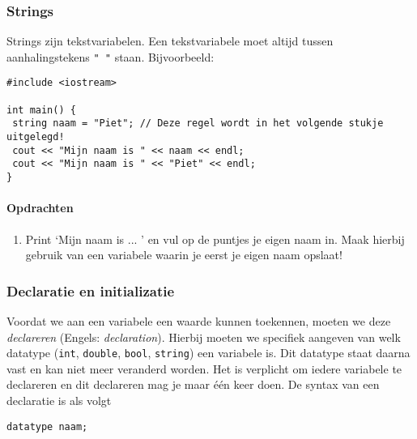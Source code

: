 \documentclass[12pt,a4paper]{article}
\newcommand{\icode}{\lstinline}
\begin{document}
\subsubsection{Strings}

Strings zijn tekstvariabelen. Een tekstvariabele moet altijd tussen aanhalingstekens \icode{" "} staan. 
Bijvoorbeeld: 

\begin{lstlisting}
#include <iostream> 

int main() {
 string naam = "Piet"; // Deze regel wordt in het volgende stukje uitgelegd! 
 cout << "Mijn naam is " << naam << endl;
 cout << "Mijn naam is " << "Piet" << endl; 
}
\end{lstlisting}

\paragraph{Opdrachten}
\begin{enumerate} 
\item 
Print `Mijn naam is ... ' en vul op de puntjes je eigen naam in. Maak hierbij gebruik van een variabele waarin je eerst je eigen naam opslaat! 
\end{enumerate} 

\subsubsection{Declaratie en initializatie}
Voordat we aan een variabele een waarde kunnen toekennen, moeten we deze \emph{declareren} (Engels: \emph{declaration}). 
Hierbij moeten we specifiek aangeven van welk datatype (\icode{int}, \icode{double}, \icode{bool}, 
\icode{string}) een variabele is. Dit datatype staat daarna vast en kan niet meer veranderd worden.
Het is verplicht om iedere variabele te declareren en dit declareren mag je maar één keer doen. 
De syntax van een declaratie is als volgt

\icode{datatype naam;} 
\end{document}

